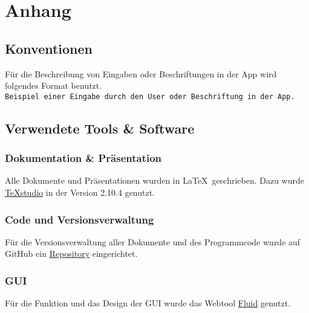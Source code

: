 \chapter{Anhang}

\section{Konventionen}

Für die Beschreibung von Eingaben oder Beschriftungen in der App wird folgendes Format benutzt. \\
{\color{IndianRed}\texttt{Beispiel einer Eingabe durch den User oder Beschriftung in der App.}}

\section{Verwendete Tools \& Software}

\subsection{Dokumentation \& Präsentation}

Alle Dokumente und Präsentationen wurden in \LaTeX \ geschrieben. Dazu wurde \href{http://texstudio.sourceforge.net}{TeXstudio} in der Version 2.10.4 genutzt. 

\subsection{Code und Versionsverwaltung}

Für die Versionsverwaltung aller Dokumente und des Programmcode wurde auf GitHub ein \href{https://github.com/MWeigert/Collector}{Repository} eingerichtet.

\subsection{GUI}

Für die Funktion und das Design der GUI wurde das Webtool \href{https://www.fluidui.com}{Fluid} genutzt.